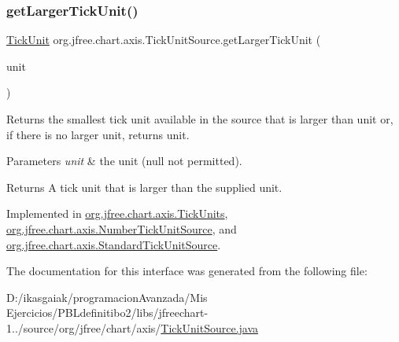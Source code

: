 \subsubsection{\texorpdfstring{get\+Larger\+Tick\+Unit()}{getLargerTickUnit()}}
{\footnotesize\ttfamily \mbox{\hyperlink{classorg_1_1jfree_1_1chart_1_1axis_1_1_tick_unit}{Tick\+Unit}} org.\+jfree.\+chart.\+axis.\+Tick\+Unit\+Source.\+get\+Larger\+Tick\+Unit (\begin{DoxyParamCaption}\item[{\mbox{\hyperlink{classorg_1_1jfree_1_1chart_1_1axis_1_1_tick_unit}{Tick\+Unit}}}]{unit }\end{DoxyParamCaption})}

Returns the smallest tick unit available in the source that is larger than {\ttfamily unit} or, if there is no larger unit, returns {\ttfamily unit}.


\begin{DoxyParams}{Parameters}
{\em unit} & the unit ({\ttfamily null} not permitted).\\
\hline
\end{DoxyParams}
\begin{DoxyReturn}{Returns}
A tick unit that is larger than the supplied unit. 
\end{DoxyReturn}


Implemented in \mbox{\hyperlink{classorg_1_1jfree_1_1chart_1_1axis_1_1_tick_units_a4f4719e1bb4772648808c0d00787a92d}{org.\+jfree.\+chart.\+axis.\+Tick\+Units}}, \mbox{\hyperlink{classorg_1_1jfree_1_1chart_1_1axis_1_1_number_tick_unit_source_a9194262fa7438a0f037a343f7de51eab}{org.\+jfree.\+chart.\+axis.\+Number\+Tick\+Unit\+Source}}, and \mbox{\hyperlink{classorg_1_1jfree_1_1chart_1_1axis_1_1_standard_tick_unit_source_a0bb7142a99b046b49fd9c902adfae64a}{org.\+jfree.\+chart.\+axis.\+Standard\+Tick\+Unit\+Source}}.



The documentation for this interface was generated from the following file\+:\begin{DoxyCompactItemize}
\item 
D\+:/ikasgaiak/programacion\+Avanzada/\+Mis Ejercicios/\+P\+B\+Ldefinitibo2/libs/jfreechart-\/1../source/org/jfree/chart/axis/\mbox{\hyperlink{_tick_unit_source_8java}{Tick\+Unit\+Source.\+java}}\end{DoxyCompactItemize}
